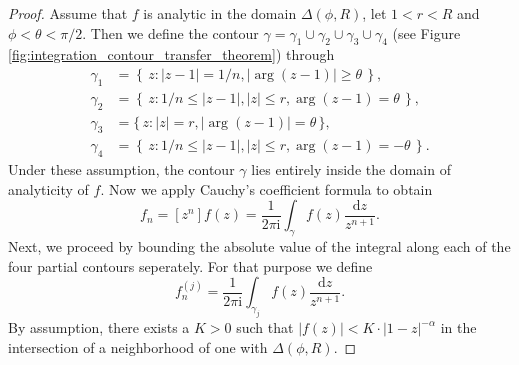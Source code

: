 \begin{proof}
  Assume that $f$ is analytic in the domain $\Delta(\phi,R)$, let $1 < r < R$ and $\phi < \theta < \pi/2$. Then we define the contour $\gamma = \gamma_{1} \cup \gamma_{2} \cup \gamma_{3} \cup \gamma_{4}$ (see Figure \ref{fig:integration_contour_transfer_theorem}) through
  \begin{align*}
    \gamma_{1} &= \left\{\, z: |z-1| = 1/n, |\arg(z-1)| \geq \theta \,\right\}, \\
    \gamma_{2} &= \left\{\, z: 1/n \leq |z-1|, |z| \leq r, \arg(z-1)=\theta \,\right\}, \\
    \gamma_{3} &= \{\, z: |z| = r, |\arg(z-1)| = \theta \,\}, \\
    \gamma_{4} &= \left\{\, z: 1/n \leq |z-1|, |z| \leq r, \arg(z-1) = -\theta \,\right\}.
  \end{align*}
  Under these assumption, the contour $\gamma$ lies entirely inside the domain of analyticity of $f$. Now we apply Cauchy's coefficient formula to obtain
  $$
    f_{n} = [z^{n}]f(z) = \frac{1}{2\pi \mathrm{i}}\int_{\gamma}f(z) \frac{\mathrm{d}z}{z^{n+1}}.
  $$ 
  Next, we proceed by bounding the absolute value of the integral along each of the four partial contours seperately. For that purpose we define
  $$
    f_n^{(j)} = \frac{1}{2 \pi \mathrm{i}} \int_{\gamma_j} f(z) \frac{\mathrm{d}z}{z^{n+1}}.
  $$
  By assumption, there exists a $K > 0$ such that $|f(z)| < K \cdot |1 - z|^{-\alpha}$ in the intersection of a neighborhood of one with $\Delta(\phi, R)$.


\end{proof}

